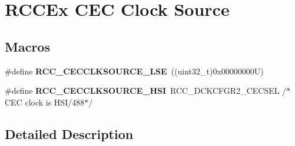 \hypertarget{group___r_c_c_ex___c_e_c___clock___source}{}\section{R\+C\+C\+Ex C\+EC Clock Source}
\label{group___r_c_c_ex___c_e_c___clock___source}
\subsection*{Macros}
\begin{DoxyCompactItemize}
\item 
\mbox{\label{group___r_c_c_ex___c_e_c___clock___source_ga0ce76c7cbd6575550c7dc4d9397d934a}} 
\#define {\bfseries R\+C\+C\+\_\+\+C\+E\+C\+C\+L\+K\+S\+O\+U\+R\+C\+E\+\_\+\+L\+SE}~((uint32\+\_\+t)0x00000000\+U)
\item 
\mbox{\label{group___r_c_c_ex___c_e_c___clock___source_ga0b52eebb2bb87574a7cfba782e59b482}} 
\#define {\bfseries R\+C\+C\+\_\+\+C\+E\+C\+C\+L\+K\+S\+O\+U\+R\+C\+E\+\_\+\+H\+SI}~R\+C\+C\+\_\+\+D\+C\+K\+C\+F\+G\+R2\+\_\+\+C\+E\+C\+S\+EL /$\ast$ C\+EC clock is H\+SI/488$\ast$/
\end{DoxyCompactItemize}


\subsection{Detailed Description}
